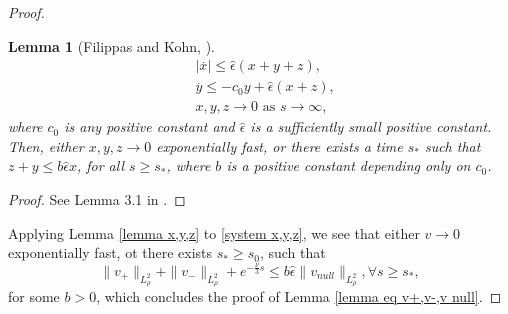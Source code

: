 \documentclass[11pt,a4paper]{article}
\newcommand{\1}{\mathbbm{1}}
\numberwithin{equation}{section}
\newtheorem{lemma}{Lemma}[section]
\theoremstyle{remark}
\begin{document}
\begin{proof}
\begin{lemma}[Filippas and Kohn, \cite{FK1992}]
\begin{equation}
\begin{split}
&|\overset{.}{x}|\leq \widehat\epsilon(x+y+z),\\
&\overset{.}{y}\leq -c_0 y+\widehat\epsilon(x+z),\\
&x,y,z\rightarrow 0 \text{ as } s\rightarrow \infty,
\end{split}
\end{equation}
where $c_0$ is any positive constant and $\widehat\epsilon$ is a sufficiently small positive constant. Then, either $x, y, z\rightarrow 0$ exponentially fast, or there exists a time $s_*$ such that $z + y \leq b\widehat\epsilon x$, for all $s \geq s_*$, where $b$ is a positive constant depending only on $c_0$.
\end{lemma}
\begin{proof}
See Lemma 3.1 in \cite{FK1992}.
\end{proof}
Applying Lemma \ref{lemma x,y,z} to \eqref{system x,y,z}, we see that either $v\rightarrow 0$ exponentially fast, ot there exists $s_*\geq s_0$, such that 
\begin{equation}\label{controll by nutral}
\|v_+\|_{L^2_\rho}+\|v_-\|_{L^2_\rho}+e^{-\frac{\nu}{3} s}\leq b\widehat{\epsilon}\|v_{null}\|_{L^2_\rho}, \forall s\geq s_*,
\end{equation}
for some $b>0$, which concludes the proof of Lemma \ref{lemma eq v+,v-,v null}.
\end{proof}
\end{document}
